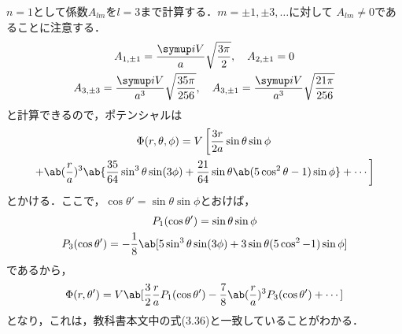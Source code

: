   $n = 1$として係数$A_{lm}$を$l = 3$まで計算する．$m = \pm 1, \pm 3, \ldots$に対して
  $A_{lm} \neq 0$であることに注意する．
  \begin{gather*}%
    A_{1,\pm 1} = \frac{\i V}{a}\sqrt{\frac{3\pi}{2}},\qq
    A_{2,\pm 1} = 0\\
    A_{3,\pm 3} = \frac{\i V}{a^3} \sqrt{\frac{35\pi}{256}},\qq
    A_{3,\pm 1} = \frac{\i V}{a^3} \sqrt{\frac{21\pi}{256}}
  \end{gather*}%
  と計算できるので，ポテンシャルは
  \begin{multline}%
    \Phi(r,\theta,\phi) = V\left[
      \frac{3r}{2a} \sin\theta\sin\phi\right.  \\
      \left.
      +
      \ab(\frac{r}{a})^3\ab\{
        \frac{35}{64}\sin^3\theta\sin(3\phi) + 
        \frac{21}{64}\sin\theta\ab(5\cos^2\theta-1)\sin\phi
      \} + \cdots
    \right]
  \end{multline}%
  とかける．ここで，$\cos\theta' = \sin\theta \sin\phi$とおけば，
  \begin{gather}%
    P_1(\cos\theta') = \sin\theta\sin\phi\\
    P_3(\cos\theta') = -\frac{1}{8}\ab[5\sin^3\theta\sin(3\phi) 
    + 3\sin\theta(5\cos^2-1)\sin\phi]
  \end{gather}%
  であるから，
  \begin{gather}%
    \Phi(r,\theta') = V\ab[\frac{3}{2} \frac ra P_1(\cos\theta') - 
    \frac{7}{8}\ab(\frac ra)^3P_3(\cos\theta') + \cdots]
  \end{gather}%
  となり，これは，教科書本文中の式(3.36)と一致していることがわかる．






